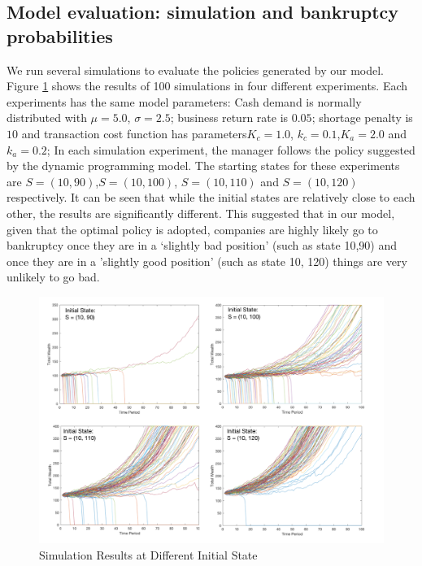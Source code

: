 \documentclass[12pt]{article}
\begin{document}
\subsection{Model evaluation: simulation and bankruptcy probabilities}
We run several simulations to evaluate the policies generated by our model. Figure \ref{simulation} shows the results of 100 simulations in four different experiments. Each experiments has the same model parameters: Cash demand is normally distributed with $\mu=5.0$, $\sigma=2.5$; business return rate is $0.05$; shortage penalty is $10$ and transaction cost function has parameters$K_c = 1.0$, $k_c=0.1$,$K_a=2.0$ and $k_a=0.2$; In each simulation experiment, the manager follows the policy suggested by the dynamic programming model. The starting states for these experiments are $S = (10,90)$,$S=(10,100)$, $S=(10,110)$ and $S=(10,120)$ respectively. It can be seen that while the initial states are relatively close to each other, the results are significantly different. This suggested that in our model, given that the optimal policy is adopted, companies are highly likely go to bankruptcy once they are in a `slightly bad position' (such as state 10,90) and once they are in a 'slightly good position' (such as state 10, 120) things are very unlikely to go bad.

\begin{figure}
\begin{center}
\includegraphics[scale=.56]{simu}
\end{center}
\caption{Simulation Results at Different Initial State}
\label{simulation}
\end{figure}
\end{document}
